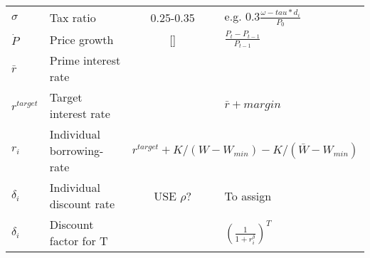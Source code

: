 \begin{longtable}{lp{5cm}cp{2.5cm}}
$\sigma$       & Tax ratio                            & 0.25-0.35  & e.g. $ 0.3\frac{\omega-tau*d_i}{P_0}$ \\
$\dot P $      & Price growth                         & []         & $\frac{P_t-P_{t-1}}{P_{t-1}}$\\
$\bar r$       & Prime interest rate                  &            & \\
$r^{target}$   & Target interest rate                 &            & $\bar r + margin$ \\
$r_i$          & Individual borrowing-rate            & \multicolumn{2}{c}{ $r^{target}+ K/(W-W_{min}) -K/(\bar W - W_{min})$}\\
$\delta_i$   & Individual discount rate        &  USE $\rho$?          & To assign \\
$\delta_i$     & Discount factor for T                &            & $\left(\frac{1}{1+r_i^\delta}\right)^T$ \\
\hline
\end{longtable}
\renewcommand{\arraystretch}{1.0}


